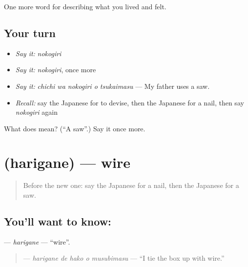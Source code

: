 \begin{grammarlens}[title={What you've built}]
One more word for describing what you lived and felt.
\end{grammarlens}

\subsection*{Your turn}
\begin{itemize}
\raggedright
  \item \emph{Say it:} \emph{nokogiri}
  \item \emph{Say it:} \emph{nokogiri}, once more
  \item \emph{Say it:} \emph{chichi wa nokogiri o tsukaimasu} — My father uses a saw.
  \item \emph{Recall:} say the Japanese for to devise, then the Japanese for a nail, then say \emph{nokogiri} again
\end{itemize}

\begin{tcolorbox}[breakable,colback=teal!4,colframe=teal!35!black,title={Before you move on}]
What does  mean? (\textquotedblleft{}A saw\textquotedblright{}.) Say it once more.
\end{tcolorbox}
\section[\texorpdfstring{\ja{はりがね} (harigane)}{はりがね (harigane)}]{ (harigane) — wire}

\label{lesson:JA-C482-harigane}



\begin{quote}
Before the new one: say the Japanese for a nail, then the Japanese for a saw.
\end{quote}

\subsection*{You'll want to know: }
\textbf{} — \emph{harigane} — \textquotedblleft{}wire\textquotedblright{}.

\begin{quote}
\textbf{  } — \emph{harigane de hako o musubimasu} — \textquotedblleft{}I tie the box up with wire.\textquotedblright{}
\end{quote}

